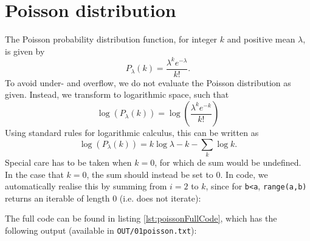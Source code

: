 \section{Poisson distribution}
The Poisson probability distribution function, for integer $k$ and positive mean $\lambda$, is given by
\begin{equation}
	P_\lambda(k) = \frac{\lambda^k e^{-\lambda}}{k!}.
\end{equation}
To avoid under- and overflow, we do not evaluate the Poisson distribution as given. Instead, we transform to logarithmic space, such that
\begin{equation}
	\log\left(P_\lambda(k)\right) = \log\left(\frac{\lambda^k e^{-k}}{k!}\right)
\end{equation}
Using standard rules for logarithmic calculus, this can be written as
\begin{equation}
	\log\left(P_\lambda(k)\right) = k\log{\lambda} - k - \sum_k \log{k}.
\end{equation}
Special care has to be taken when $k=0$, for which de sum would be undefined. In the case that $k=0$, the sum should instead be set to $0$. In code, we automatically realise this by summing from $i=2$ to $k$, since for \verb|b<a|, \verb|range(a,b)| returns an iterable of length $0$ (i.e. does not iterate):

The full code can be found in listing \ref{lst:poissonFullCode}, which has the following output (available in \texttt{OUT/01poisson.txt}):



